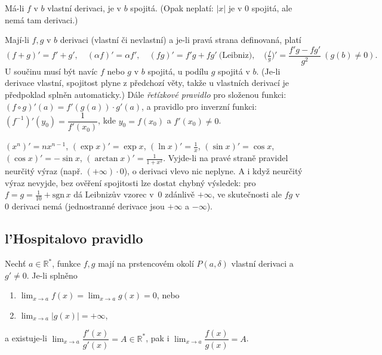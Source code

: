\documentclass[11pt,a4paper]{article}
\begin{document}
\begin{veta}
Má-li $f$ v $b$ vlastní derivaci, je v $b$ spojitá. (Opak neplatí: $|x|$ je v $0$ spojitá, ale nemá tam derivaci.)
\end{veta}

\begin{veta}
Mají-li $f,g$ v $b$ derivaci (vlastní či nevlastní) a je-li pravá strana definovaná, platí
\[
  (f+g)'=f'+g',\quad (\alpha f)'=\alpha f',\quad (fg)'=f'g+fg'\ \text{(Leibniz)},\quad \Big(\tfrac{f}{g}\Big)'=\frac{f'g-fg'}{g^2}\ (g(b)\neq0).
\]
U součinu musí být navíc $f$ nebo $g$ v $b$ spojitá, u podílu $g$ spojitá v $b$. (Je-li derivace vlastní, spojitost plyne z předchozí věty, takže u vlastních derivací je předpoklad splněn automaticky.)
Dále \emph{řetízkové pravidlo} pro složenou funkci: $(f\circ g)'(a)=f'(g(a))\cdot g'(a)$, a pravidlo pro inverzní funkci: $(f^{-1})'(y_0)=\dfrac{1}{f'(x_0)}$, kde $y_0=f(x_0)$ a $f'(x_0)\neq0$.
\end{veta}

\begin{poznamka}
$(x^n)'=nx^{n-1}$, $(\exp x)'=\exp x$, $(\ln x)'=\tfrac1x$, $(\sin x)'=\cos x$, $(\cos x)'=-\sin x$, $(\arctan x)'=\tfrac1{1+x^2}$. Vyjde-li na pravé straně pravidel neurčitý výraz (např. $(+\infty)\cdot0$), o derivaci vlevo nic neplyne. A i když neurčitý výraz nevyjde, bez ověření spojitosti lze dostat chybný výsledek: pro $f=g=\tfrac1{10}+\mathrm{sgn}\,x$ dá Leibnizův vzorec v~$0$ zdánlivě $+\infty$, ve skutečnosti ale $fg$ v~$0$ derivaci nemá (jednostranné derivace jsou $+\infty$ a $-\infty$).
\end{poznamka}



\subsection{l'Hospitalovo pravidlo}

\begin{veta}
Nechť $a\in\mathbb{R}^*$, funkce $f,g$ mají na prstencovém okolí $P(a,\delta)$ vlastní derivaci a $g'\neq0$. Je-li splněno
\begin{enumerate}
  \item $\lim_{x\to a}f(x)=\lim_{x\to a}g(x)=0$, \quad nebo \quad
  \item $\lim_{x\to a}|g(x)|=+\infty$,
\end{enumerate}
a existuje-li $\lim_{x\to a}\dfrac{f'(x)}{g'(x)}=A\in\mathbb{R}^*$, pak i $\lim_{x\to a}\dfrac{f(x)}{g(x)}=A$.
\end{veta}
\end{document}
